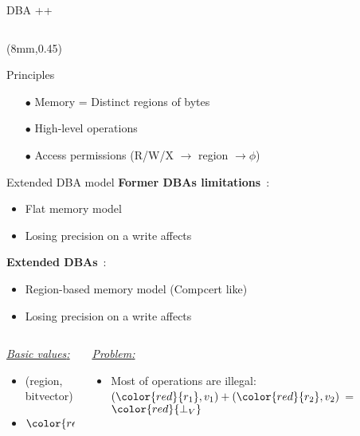 \begin{frame}{DBA ++}
\begin{columns}
\begin{column}{0.5\linewidth}
     \end{column}
     \end{columns}
     \begin{textblock*}{60mm}(8mm,0.45\textheight)
     \begin{blueblock}{Principles}
     \scriptsize
     \begin{itemize}
     \item[$\bullet$] Memory = Distinct regions of bytes 
     \item[$\bullet$] High-level operations
     \item[$\bullet$] Access permissions {\tiny (R/W/X $\rightarrow$ region $\rightarrow \phi$)}
     \end{itemize}
     \end{blueblock}
     \end{textblock*}
\end{frame}


\begin{frame}{Extended DBA model}
     \textbf{Former DBAs limitations}~:
     \begin{itemize}
     \item Flat memory model
     \item Losing precision on a write affects {\color{red}{all memory space}} 
     \end{itemize}
     \medskip
     \textbf{Extended DBAs}~:
     \begin{itemize}
     \item Region-based memory model (Compcert like)
     \item Losing precision on a write affects {\color{blue}{a single memory region}}  
     \end{itemize}
     \bigskip
     \begin{columns}[t]
     \begin{column}[T]{3.7cm}
     \underline{\it{Basic values}:}
     \begin{itemize}
     \item (region, bitvector)
     \item ${\color{red}{\bot_V}}$
     \end{itemize}
     \end{column}
     \pause
     \begin{column}[T]{6cm}
     \underline{\it{Problem}:}
     \begin{itemize}
     \item Most of operations are illegal: $({\color{red}{r_1}}, v_1) + ({\color{red}{r_2}}, v_2)$ = ${\color{red}{\bot_V}}$
     \end{itemize}
     \end{column}
     \end{columns}
\end{frame}



